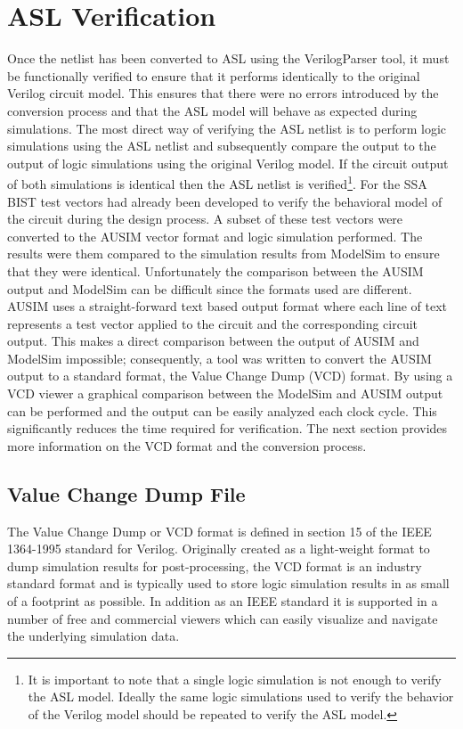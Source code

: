 \documentclass[12pt]{report}
\begin{document}
\section{ASL Verification}
Once the netlist has been converted to ASL using the VerilogParser tool, it must be functionally verified to ensure that it performs identically to the original Verilog circuit model.  This ensures that there were no errors introduced by the conversion process and that the ASL model will behave as expected during simulations.  The most direct way of verifying the ASL netlist is to perform logic simulations using the ASL netlist and subsequently compare the output to the output of logic simulations using the original Verilog model.  If the circuit output of both simulations is identical then the ASL netlist is verified\footnote{It is important to note that a single logic simulation is not enough to verify the ASL model.  Ideally the same logic simulations used to verify the behavior of the Verilog model should be repeated to verify the ASL model.}.  For the SSA BIST test vectors had already been developed to verify the behavioral model of the circuit during the design process.  A subset of these test vectors were converted to the AUSIM vector format and logic simulation performed.  The results were them compared to the simulation results from ModelSim to ensure that they were identical.  Unfortunately the comparison between the AUSIM output and ModelSim can be difficult since the formats used are different.  AUSIM uses a straight-forward text based output format where each line of text represents a test vector applied to the circuit and the corresponding circuit output.  This makes a direct comparison between the output of AUSIM and ModelSim impossible; consequently, a tool was written to convert the AUSIM output to a standard format, the Value Change Dump (VCD) format.  By using a VCD viewer a graphical comparison between the ModelSim and AUSIM output can be performed and the output can be easily analyzed each clock cycle.  This significantly reduces the time required for verification.  The next section provides more information on the VCD format and the conversion process.

\subsection{Value Change Dump File}
The Value Change Dump or VCD format is defined in section 15 of the IEEE 1364-1995 standard for Verilog\cite{verilog}.  Originally created as a light-weight format to dump simulation results for post-processing\cite{verilog}, the VCD format is an industry standard format and is typically used to store logic simulation results in as small of a footprint as possible\cite{verilog}.  In addition as an IEEE standard it is supported in a number of free and commercial viewers which can easily visualize and navigate the underlying simulation data. 
\end{document}
